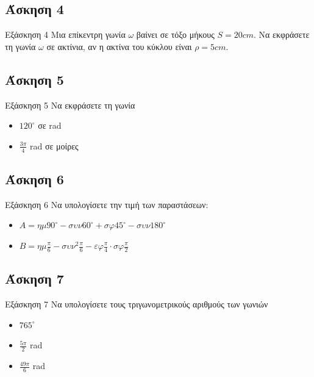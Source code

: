 \documentclass[greek]{beamer}
\begin{document}
\subsection{Άσκηση 4}
\begin{frame}[label=Άσκηση4]{Εξάσκηση 4}
 Μια επίκεντρη γωνία $ω$ βαίνει σε τόξο μήκους $S=20cm$. Να εκφράσετε τη γωνία $ω$ σε ακτίνια, αν η ακτίνα του κύκλου είναι $ρ=5cm$.

\end{frame}

\subsection{Άσκηση 5}
\begin{frame}[label=Άσκηση5]{Εξάσκηση 5}
 Να εκφράσετε τη γωνία
 \begin{itemize}
  \item<1-> $120^{\circ}$ σε rad
  \item<2-> $\frac{3π}{4}$ rad σε μοίρες
 \end{itemize}

\end{frame}

\subsection{Άσκηση 6}
\begin{frame}[label=Άσκηση6]{Εξάσκηση 6}
 Να υπολογίσετε την τιμή των παραστάσεων:
 \begin{itemize}
  \item<1-> $Α=ημ90^{\circ}-συν60^{\circ}+σφ45^{\circ}-συν180^{\circ}$
  \item<2-> $Β=ημ\frac{π}{6}-συν^2\frac{π}{6}-εφ\frac{π}{4}\cdot σφ\frac{π}{2}$
 \end{itemize}

\end{frame}

\subsection{Άσκηση 7}
\begin{frame}[label=Άσκηση]{Εξάσκηση 7}
 Να υπολογίσετε τους τριγωνομετρικούς αριθμούς των γωνιών
 \begin{itemize}
  \item<1-> $765^{\circ}$
  \item<2-> $\frac{5π}{2}$ rad
  \item<3-> $\frac{49π}{6}$ rad
 \end{itemize}

\end{frame}
\end{document}
